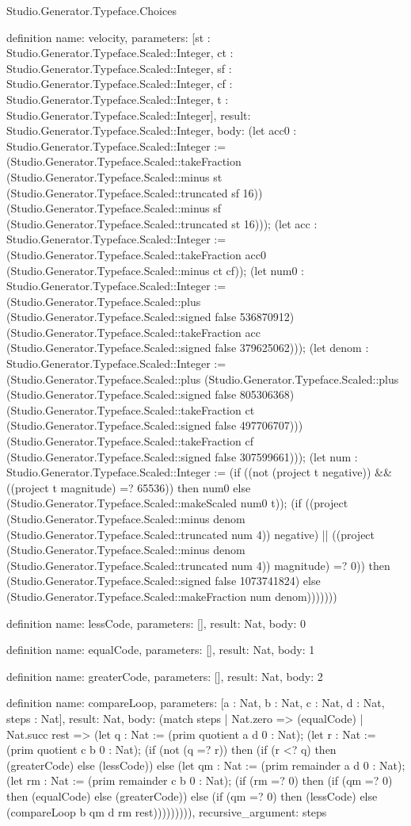 \begin{lexlean}{Studio.Generator.Typeface.Choices}
\begin{semanticmodule}
definition{
  name: velocity,
  parameters: [st : Studio.Generator.Typeface.Scaled::Integer, ct : Studio.Generator.Typeface.Scaled::Integer, sf : Studio.Generator.Typeface.Scaled::Integer, cf : Studio.Generator.Typeface.Scaled::Integer, t : Studio.Generator.Typeface.Scaled::Integer],
  result: Studio.Generator.Typeface.Scaled::Integer,
  body: (let acc0 : Studio.Generator.Typeface.Scaled::Integer := (Studio.Generator.Typeface.Scaled::takeFraction (Studio.Generator.Typeface.Scaled::minus st (Studio.Generator.Typeface.Scaled::truncated sf 16)) (Studio.Generator.Typeface.Scaled::minus sf (Studio.Generator.Typeface.Scaled::truncated st 16))); (let acc : Studio.Generator.Typeface.Scaled::Integer := (Studio.Generator.Typeface.Scaled::takeFraction acc0 (Studio.Generator.Typeface.Scaled::minus ct cf)); (let num0 : Studio.Generator.Typeface.Scaled::Integer := (Studio.Generator.Typeface.Scaled::plus (Studio.Generator.Typeface.Scaled::signed false 536870912) (Studio.Generator.Typeface.Scaled::takeFraction acc (Studio.Generator.Typeface.Scaled::signed false 379625062))); (let denom : Studio.Generator.Typeface.Scaled::Integer := (Studio.Generator.Typeface.Scaled::plus (Studio.Generator.Typeface.Scaled::plus (Studio.Generator.Typeface.Scaled::signed false 805306368) (Studio.Generator.Typeface.Scaled::takeFraction ct (Studio.Generator.Typeface.Scaled::signed false 497706707))) (Studio.Generator.Typeface.Scaled::takeFraction cf (Studio.Generator.Typeface.Scaled::signed false 307599661))); (let num : Studio.Generator.Typeface.Scaled::Integer := (if ((not (project t negative)) && ((project t magnitude) =? 65536)) then num0 else (Studio.Generator.Typeface.Scaled::makeScaled num0 t)); (if ((project (Studio.Generator.Typeface.Scaled::minus denom (Studio.Generator.Typeface.Scaled::truncated num 4)) negative) || ((project (Studio.Generator.Typeface.Scaled::minus denom (Studio.Generator.Typeface.Scaled::truncated num 4)) magnitude) =? 0)) then (Studio.Generator.Typeface.Scaled::signed false 1073741824) else (Studio.Generator.Typeface.Scaled::makeFraction num denom)))))))
}

definition{
  name: lessCode,
  parameters: [],
  result: Nat,
  body: 0
}

definition{
  name: equalCode,
  parameters: [],
  result: Nat,
  body: 1
}

definition{
  name: greaterCode,
  parameters: [],
  result: Nat,
  body: 2
}

definition{
  name: compareLoop,
  parameters: [a : Nat, b : Nat, c : Nat, d : Nat, steps : Nat],
  result: Nat,
  body: (match steps
    | Nat.zero => (equalCode)
    | Nat.succ rest => (let q : Nat := (prim quotient a d 0 : Nat); (let r : Nat := (prim quotient c b 0 : Nat); (if (not (q =? r)) then (if (r <? q) then (greaterCode) else (lessCode)) else (let qm : Nat := (prim remainder a d 0 : Nat); (let rm : Nat := (prim remainder c b 0 : Nat); (if (rm =? 0) then (if (qm =? 0) then (equalCode) else (greaterCode)) else (if (qm =? 0) then (lessCode) else (compareLoop b qm d rm rest))))))))),
  recursive_argument: steps
}


\end{semanticmodule}
\end{lexlean}
